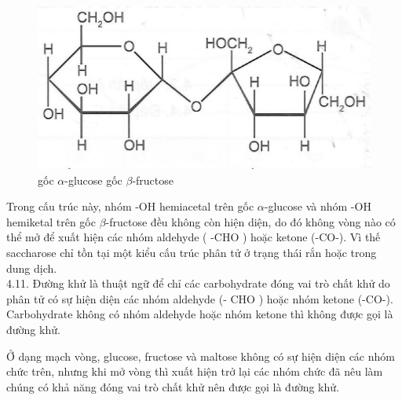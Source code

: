 \documentclass[10pt]{article}
\begin{document}
\begin{figure}[h]
\begin{center}
  \includegraphics[width=\textwidth]{2025_10_23_b4e16b74380d0f7e7700g-029}
\captionsetup{labelformat=empty}
\caption{gốc $\alpha$-glucose gốc $\beta$-fructose}
\end{center}
\end{figure}

Trong cấu trúc này, nhóm -OH hemiacetal trên gốc $\alpha$-glucose và nhóm -OH hemiketal trên gốc $\beta$-fructose đều không còn hiện diện, do đó không vòng nào có thể mở để xuất hiện các nhóm aldehyde ( -CHO ) hoặc ketone (-CO-). Vì thế saccharose chỉ tồn tại một kiểu cấu trúc phân tử ở trạng thái rắn hoặc trong dung dịch.\\
4.11. Đường khử là thuật ngữ để chỉ các carbohydrate đóng vai trò chất khử do phân tử có sự hiện diện các nhóm aldehyde (- CHO ) hoặc nhóm ketone (-CO-). Carbohydrate không có nhóm aldehyde hoặc nhóm ketone thì không được gọi là đường khử.

Ở dạng mạch vòng, glucose, fructose và maltose không có sự hiện diện các nhóm chức trên, nhưng khi mở vòng thì xuất hiện trở lại các nhóm chức đã nêu làm chúng có khả năng đóng vai trò chất khử nên được gọi là đường khử.
\end{document}
